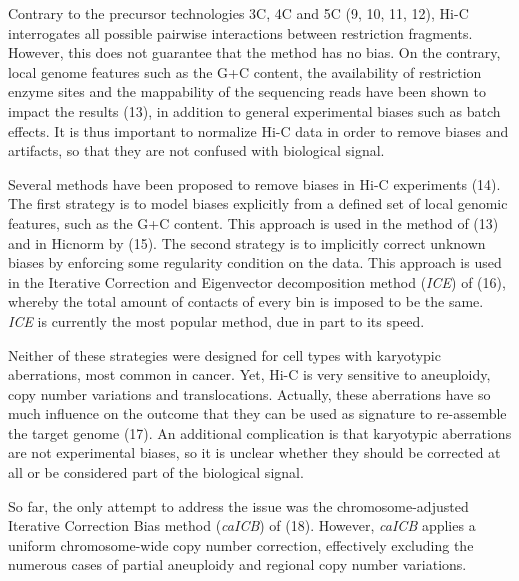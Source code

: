 \documentclass[a4,center,fleqn]{NAR}
\providecommand{\DIFadd}[1]{{\protect\color{red}#1}} %
\providecommand{\DIFdel}[1]{{\protect}}                      %
\providecommand{\DIFaddbegin}{} %
\providecommand{\DIFaddend}{} %
\providecommand{\DIFdelbegin}{} %
\providecommand{\DIFdelend}{} %
\begin{document}
Contrary to the precursor technologies 3C, 4C and 5C
(9, 10, 11, 12), Hi-C interrogates all possible
pairwise interactions between restriction fragments. However, this does
not guarantee that the method has no bias.  On the contrary, local genome
features such as the G+C content, the availability of restriction enzyme
sites and the mappability of the sequencing reads have been shown to
impact the results (13), in addition to general
experimental biases such as batch effects. It is thus important to
normalize Hi-C data in order to remove biases and artifacts, so that they
are not confused with biological signal.

Several methods have been proposed to remove biases in Hi-C experiments
(14). The first strategy is to model biases
explicitly from a defined set of local genomic features, such as the G+C
content. This approach is used in the method of
(13) and in Hicnorm by (15). The
second strategy is to implicitly correct unknown biases by enforcing some
regularity condition on the data. This approach is used in the
Iterative Correction and Eigenvector decomposition method (\textit{ICE})
of (16), whereby the total amount of contacts of
every bin is imposed to be the same. \textit{ICE} is currently the most
popular method, due in part to its speed.

Neither of these strategies were designed for cell types with karyotypic
aberrations, most common in cancer. Yet, Hi-C is very sensitive to
aneuploidy, copy number variations and translocations.  Actually, these
aberrations have so much influence on the outcome that they can be used as
\DIFdelbegin \DIFdel{signatureto }\DIFdelend \DIFaddbegin \DIFadd{signature to }\DIFaddend re-assemble the target genome (17). An
additional complication is that karyotypic aberrations are not
experimental biases, so it is unclear whether they should be corrected at
all or be considered part of the biological signal.

\enlargethispage{-65.1pt}

So far, the only attempt to address the issue was the chromosome-adjusted
Iterative Correction Bias method (\textit{caICB}) of
(18). However, \textit{caICB} applies a uniform
chromosome-wide copy number correction, effectively excluding the numerous
cases of partial aneuploidy and regional copy number variations.
\end{document}

